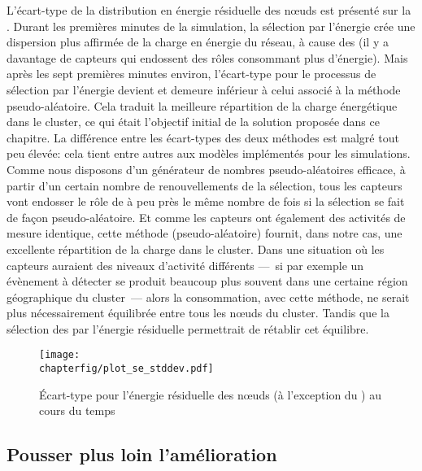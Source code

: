 L'écart-type de la distribution en énergie résiduelle des nœuds est présenté sur la .
Durant les premières minutes de la simulation, la sélection par l'énergie crée une dispersion plus affirmée de la charge en énergie du réseau, à cause des \vns (il y a davantage de capteurs qui endossent des rôles consommant plus d'énergie).
Mais après les sept premières minutes environ, l'écart-type pour le processus de sélection par l'énergie devient et demeure inférieur à celui associé à la méthode pseudo-aléatoire.
Cela traduit la meilleure répartition de la charge énergétique dans le cluster, ce qui était l'objectif initial de la solution proposée dans ce chapitre.
La différence entre les écart-types des deux méthodes est malgré tout peu élevée: cela tient entre autres aux modèles implémentés pour les simulations.
Comme nous disposons d'un générateur de nombres pseudo-aléatoires efficace, à partir d'un certain nombre de renouvellements de la sélection, tous les capteurs vont endosser le rôle de \cn à peu près le même nombre de fois si la sélection se fait de façon pseudo-aléatoire.
Et comme les capteurs ont également des activités de mesure identique, cette méthode (pseudo-aléatoire) fournit, dans notre cas, une excellente répartition de la charge dans le cluster.
Dans une situation où les capteurs auraient des niveaux d'activité différents ---~si par exemple un évènement à détecter se produit beaucoup plus souvent dans une certaine région géographique du cluster~--- alors la consommation, avec cette méthode, ne serait plus nécessairement équilibrée entre tous les nœuds du cluster.
Tandis que la sélection des \cns par l'énergie résiduelle permettrait de rétablir cet équilibre.
\begin{figure}[!ht]
    \centering
    \texttt{[image: \\chapterfig/plot\_se\_stddev.pdf]}
    \caption[Écart-type pour l'énergie résiduelle des nœuds au cours du temps]{Écart-type pour l'énergie résiduelle des nœuds (à l'exception du \ch) au cours du temps}\label{se:fig:stddev}
\end{figure}

    \subsection{Pousser plus loin l'amélioration}

